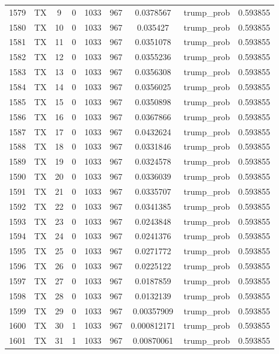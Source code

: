 \documentclass[12pt,a4paper]{article}
\begin{document}
\begin{tabular}{r|cccccccc}
	1579 & TX & 9 & 0 & 1033 & 967 & 0.0378567 & trump\_prob & 0.593855 \\
	1580 & TX & 10 & 0 & 1033 & 967 & 0.035427 & trump\_prob & 0.593855 \\
	1581 & TX & 11 & 0 & 1033 & 967 & 0.0351078 & trump\_prob & 0.593855 \\
	1582 & TX & 12 & 0 & 1033 & 967 & 0.0355236 & trump\_prob & 0.593855 \\
	1583 & TX & 13 & 0 & 1033 & 967 & 0.0356308 & trump\_prob & 0.593855 \\
	1584 & TX & 14 & 0 & 1033 & 967 & 0.0356025 & trump\_prob & 0.593855 \\
	1585 & TX & 15 & 0 & 1033 & 967 & 0.0350898 & trump\_prob & 0.593855 \\
	1586 & TX & 16 & 0 & 1033 & 967 & 0.0367866 & trump\_prob & 0.593855 \\
	1587 & TX & 17 & 0 & 1033 & 967 & 0.0432624 & trump\_prob & 0.593855 \\
	1588 & TX & 18 & 0 & 1033 & 967 & 0.0331846 & trump\_prob & 0.593855 \\
	1589 & TX & 19 & 0 & 1033 & 967 & 0.0324578 & trump\_prob & 0.593855 \\
	1590 & TX & 20 & 0 & 1033 & 967 & 0.0336039 & trump\_prob & 0.593855 \\
	1591 & TX & 21 & 0 & 1033 & 967 & 0.0335707 & trump\_prob & 0.593855 \\
	1592 & TX & 22 & 0 & 1033 & 967 & 0.0341385 & trump\_prob & 0.593855 \\
	1593 & TX & 23 & 0 & 1033 & 967 & 0.0243848 & trump\_prob & 0.593855 \\
	1594 & TX & 24 & 0 & 1033 & 967 & 0.0241376 & trump\_prob & 0.593855 \\
	1595 & TX & 25 & 0 & 1033 & 967 & 0.0271772 & trump\_prob & 0.593855 \\
	1596 & TX & 26 & 0 & 1033 & 967 & 0.0225122 & trump\_prob & 0.593855 \\
	1597 & TX & 27 & 0 & 1033 & 967 & 0.0187859 & trump\_prob & 0.593855 \\
	1598 & TX & 28 & 0 & 1033 & 967 & 0.0132139 & trump\_prob & 0.593855 \\
	1599 & TX & 29 & 0 & 1033 & 967 & 0.00357909 & trump\_prob & 0.593855 \\
	1600 & TX & 30 & 1 & 1033 & 967 & 0.000812171 & trump\_prob & 0.593855 \\
	1601 & TX & 31 & 1 & 1033 & 967 & 0.00870061 & trump\_prob & 0.593855 \\

\end{tabular}
\end{document}
